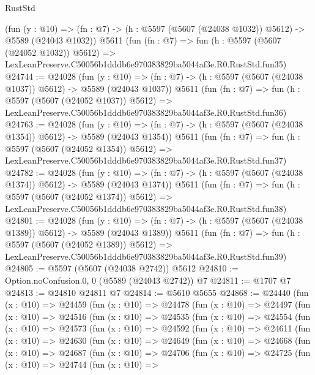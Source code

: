 \begin{lexlean}{RustStd}
\begin{coremodule}
    (fun (y : @10) => (fn : @7) -> (h : @5597 (@5607 (@24038 @1032)) @5612) -> @5589 (@24043 @1032))
    @5611
    (fun (fn : @7) =>
    fun (h : @5597 (@5607 (@24052 @1032)) @5612) =>
    LexLeanPreserve.C50056b1dddb6e970383829ba5044af3e.R0.RustStd.fun35)
@24744 := @24028
    (fun (y : @10) => (fn : @7) -> (h : @5597 (@5607 (@24038 @1037)) @5612) -> @5589 (@24043 @1037))
    @5611
    (fun (fn : @7) =>
    fun (h : @5597 (@5607 (@24052 @1037)) @5612) =>
    LexLeanPreserve.C50056b1dddb6e970383829ba5044af3e.R0.RustStd.fun36)
@24763 := @24028
    (fun (y : @10) => (fn : @7) -> (h : @5597 (@5607 (@24038 @1354)) @5612) -> @5589 (@24043 @1354))
    @5611
    (fun (fn : @7) =>
    fun (h : @5597 (@5607 (@24052 @1354)) @5612) =>
    LexLeanPreserve.C50056b1dddb6e970383829ba5044af3e.R0.RustStd.fun37)
@24782 := @24028
    (fun (y : @10) => (fn : @7) -> (h : @5597 (@5607 (@24038 @1374)) @5612) -> @5589 (@24043 @1374))
    @5611
    (fun (fn : @7) =>
    fun (h : @5597 (@5607 (@24052 @1374)) @5612) =>
    LexLeanPreserve.C50056b1dddb6e970383829ba5044af3e.R0.RustStd.fun38)
@24801 := @24028
    (fun (y : @10) => (fn : @7) -> (h : @5597 (@5607 (@24038 @1389)) @5612) -> @5589 (@24043 @1389))
    @5611
    (fun (fn : @7) =>
    fun (h : @5597 (@5607 (@24052 @1389)) @5612) =>
    LexLeanPreserve.C50056b1dddb6e970383829ba5044af3e.R0.RustStd.fun39)
@24805 := @5597 (@5607 (@24038 @2742)) @5612
@24810 := Option.noConfusion.{0, 0} (@5589 (@24043 @2742)) @7
@24811 := @1707 @7
@24813 := @24810 @24811 @7
@24814 := @5610 @5655
@24868 := @24440
    (fun (x : @10) =>
    @24459
      (fun (x : @10) =>
      @24478
        (fun (x : @10) =>
        @24497
          (fun (x : @10) =>
          @24516
            (fun (x : @10) =>
            @24535
              (fun (x : @10) =>
              @24554
                (fun (x : @10) =>
                @24573
                  (fun (x : @10) =>
                  @24592
                    (fun (x : @10) =>
                    @24611
                      (fun (x : @10) =>
                      @24630
                        (fun (x : @10) =>
                        @24649
                          (fun (x : @10) =>
                          @24668
                            (fun (x : @10) =>
                            @24687
                              (fun (x : @10) =>
                              @24706
                                (fun (x : @10) =>
                                @24725
                                  (fun (x : @10) =>
                                  @24744
                                    (fun (x : @10) =>

\end{coremodule}
\end{lexlean}
